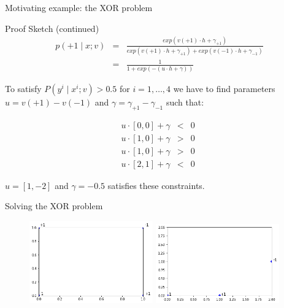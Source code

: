 \begin{frame}{Motivating example: the XOR problem}
\begin{block}{Proof Sketch (continued)}
\begin{eqnarray*}
p(+1 \mid x; v) &=& \frac{exp(v(+1) \cdot h  + \gamma_{+1})}{exp(v(+1) \cdot h  + \gamma_{+1}) + exp(v(-1) \cdot h + \gamma_{-1})} \\
&=& \frac{1}{1 + exp(-(u \cdot h + \gamma))}
\end{eqnarray*}

\pause
To satisfy $P(y^i \mid x^i; v) > 0.5$ for $i = 1,\ldots,4$
we have to find parameters $u = v(+1) - v(-1)$ and $\gamma = \gamma_{+1} - \gamma_{-1}$
such that:

\begin{eqnarray*}
u \cdot [0,0] + \gamma &<& 0 \\
u \cdot [1,0] + \gamma &>& 0 \\
u \cdot [1,0] + \gamma &>& 0 \\
u \cdot [2,1] + \gamma &<& 0 \end{eqnarray*}

$u = [1, -2]$ and $\gamma = -0.5$ satisfies these constraints.
\end{block}
\end{frame}

\begin{frame}{Solving the XOR problem}
\begin{figure}
   \includegraphics[width=0.475\textwidth]{figures/xorbefore.png}
   \hfill
   \includegraphics[width=0.475\textwidth]{figures/xorafter.png}
\end{figure}
\end{frame}




 

